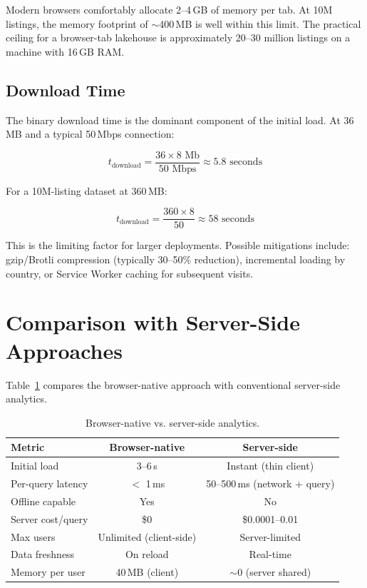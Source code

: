 \documentclass[11pt,a4paper,twoside]{book}
\begin{document}
Modern browsers comfortably allocate 2--4\,GB of memory per tab. At 10M listings, the memory
footprint of $\sim$400\,MB is well within this limit. The practical ceiling for a browser-tab
lakehouse is approximately 20--30 million listings on a machine with 16\,GB RAM.

\subsection{Download Time}

The binary download time is the dominant component of the initial load. At 36\,MB and a
typical 50\,Mbps connection:

$$t_{\text{download}} = \frac{36 \times 8 \text{ Mb}}{50 \text{ Mbps}} \approx 5.8 \text{ seconds}$$

For a 10M-listing dataset at 360\,MB:

$$t_{\text{download}} = \frac{360 \times 8}{50} \approx 58 \text{ seconds}$$

This is the limiting factor for larger deployments. Possible mitigations include:
gzip/Brotli compression (typically 30--50\% reduction), incremental loading by country,
or Service Worker caching for subsequent visits.

\section{Comparison with Server-Side Approaches}

Table~\ref{tab:compare} compares the browser-native approach with conventional server-side
analytics.

\begin{table}[H]
\centering
\caption{Browser-native vs. server-side analytics.}
\label{tab:compare}
\begin{tabular}{@{}lcc@{}}
\toprule
\textbf{Metric} & \textbf{Browser-native} & \textbf{Server-side} \\
\midrule
Initial load      & 3--6\,s               & Instant (thin client) \\
Per-query latency & $<$ 1\,ms              & 50--500\,ms (network + query) \\
Offline capable   & Yes                   & No \\
Server cost/query & \$0                   & \$0.0001--0.01 \\
Max users         & Unlimited (client-side) & Server-limited \\
Data freshness    & On reload             & Real-time \\
Memory per user   & 40\,MB (client)       & $\sim$0 (server shared) \\
\bottomrule
\end{tabular}
\end{table}
\end{document}
